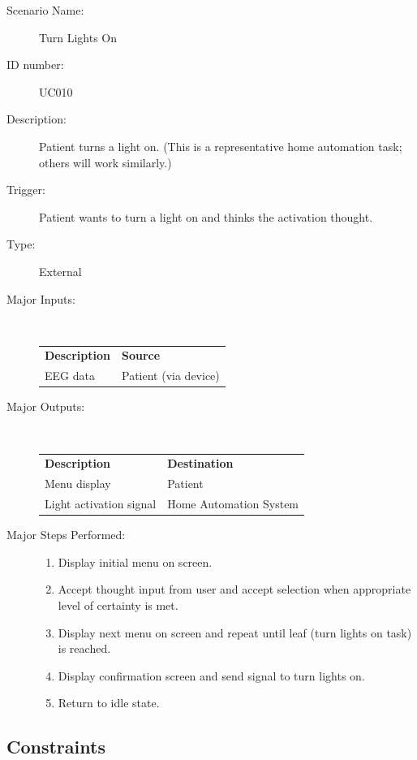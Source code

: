 \documentclass{article}
\begin{document}
\begin{description}
    \item[Scenario Name:] Turn Lights On
    \item[ID number:] UC010
    \item[Description:] Patient turns a light on. (This is a representative
        home automation task; others will work similarly.)
    \item[Trigger:] Patient wants to turn a light on and thinks the activation thought.
    \item[Type:] External
    \item[Major Inputs:] \hfill \\
        \begin{tabular}{l l}
            \textbf{Description} & \textbf{Source} \\
            EEG data & Patient (via device) \\
        \end{tabular}
    \item[Major Outputs:] \hfill \\
        \begin{tabular}{l l}
            \textbf{Description} & \textbf{Destination} \\
            Menu display & Patient \\
            Light activation signal & Home Automation System
        \end{tabular}
    \item[Major Steps Performed:] \hfill
        \begin{enumerate}
            \item Display initial menu on screen.
            \item Accept thought input from user and accept selection when
                appropriate level of certainty is met.
            \item Display next menu on screen and repeat until leaf (turn
                lights on task) is reached.
            \item Display confirmation screen and send signal to turn lights
                on.
            \item Return to idle state.
        \end{enumerate}
\end{description}

\subsection{Constraints}
\end{document}
